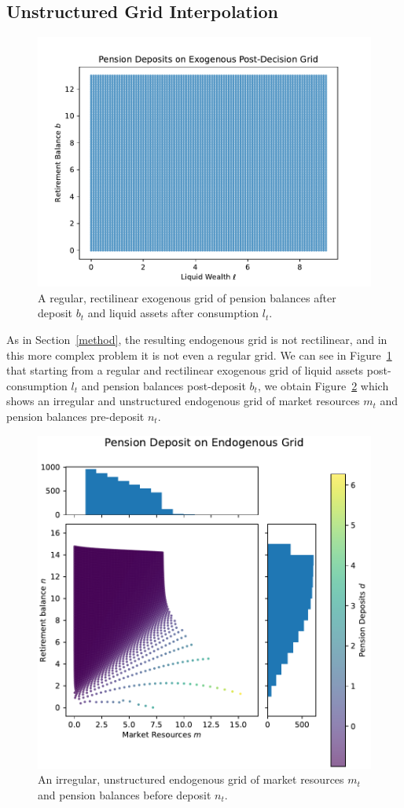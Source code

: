 \documentclass{article}
\newcommand{\bRat}{b}
\newcommand{\mRat}{m}
\newcommand{\nRat}{n}
\newcommand{\lRat}{l}
\begin{document}
\subsection{Unstructured Grid Interpolation}\label{Unstructured Grid Interpolation}

\begin{figure}[!htbp]
\centering
\includegraphics[width=0.7\linewidth]{files/ExogenousGrid-1327071c329af94ca01fc2e5abdd3eed.pdf}
\caption{A regular, rectilinear exogenous grid of pension balances after deposit $\bRat_{t}$ and liquid assets after consumption $\lRat_{t}$.}
\label{fig:exog}
\end{figure}

As in Section~\ref{method}, the resulting endogenous grid is not rectilinear, and in this more complex problem it is not even a regular grid. We can see in  Figure~\ref{fig:exog} that starting from a regular and rectilinear exogenous grid of liquid assets post-consumption $\lRat_{t}$ and pension balances post-deposit $\bRat_{t}$, we obtain Figure~\ref{fig:endog} which shows an irregular and unstructured endogenous grid of market resources $\mRat_{t}$ and pension balances pre-deposit $\nRat_{t}$.

\begin{figure}[!htbp]
\centering
\includegraphics[width=0.7\linewidth]{files/EndogenousGrid-1ee13ab9f6b5410a9683ff5c35d8253e.pdf}
\caption{An irregular, unstructured endogenous grid of market resources $\mRat_{t}$ and pension balances before deposit $\nRat_{t}$.}
\label{fig:endog}
\end{figure}
\end{document}
